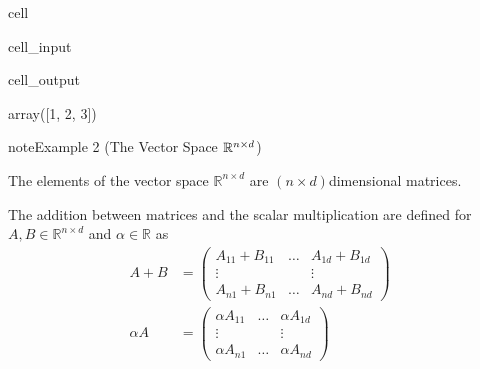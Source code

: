 \documentclass[letterpaper,10pt,english]{jupyterBook}
\begin{document}
\begin{sphinxuseclass}{cell}\begin{sphinxVerbatimInput}

\begin{sphinxuseclass}{cell_input}
\begin{sphinxVerbatim}[commandchars=\\\{\}]
\PYG{p}{[}\PYG{p}{]}
\end{sphinxVerbatim}

\end{sphinxuseclass}\end{sphinxVerbatimInput}
\begin{sphinxVerbatimOutput}

\begin{sphinxuseclass}{cell_output}
\begin{sphinxVerbatim}[commandchars=\\\{\}]
array([1, 2, 3])
\end{sphinxVerbatim}

\end{sphinxuseclass}\end{sphinxVerbatimOutput}

\end{sphinxuseclass}\label{linalg_spaces:example-3}
\begin{sphinxadmonition}{note}{Example 2 (The Vector Space \protect\(\mathbb{R}^{n\times d}\protect\))}



\sphinxAtStartPar
The elements of the vector space \(\mathbb{R}^{n\times d}\) are \((n\times d)\)\sphinxhyphen{}dimensional matrices.

\sphinxAtStartPar
The addition between matrices and the scalar multiplication are defined for \(A,B\in\mathbb{R}^{n\times d}\) and \(\alpha\in\mathbb{R}\) as
\begin{align*}
    A+B &= \begin{pmatrix}
        A_{11 } + B_{11} & \ldots& A_{1d}+B_{1d}\\
       \vdots& & \vdots\\
A_{n1}+B_{n1} &\ldots & A_{nd}+B_{nd} 
\end{pmatrix}\\
    \alpha A &= \begin{pmatrix}
        \alpha A_{11 } & \ldots& \alpha A_{1d}\\
       \vdots& & \vdots\\
\alpha A_{n1} &\ldots & \alpha A_{nd} 
\end{pmatrix}
\end{align*}\end{sphinxadmonition}
\end{document}

